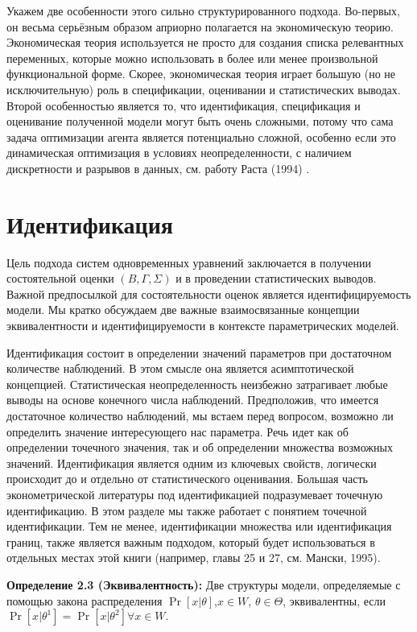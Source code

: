 Укажем две особенности этого сильно структурированного подхода. 
Во-первых, он весьма серьёзным образом априорно полагается на экономическую теорию. Экономическая теория  используется не просто для создания списка релевантных переменных, которые можно использовать в более или менее произвольной  функциональной форме. Скорее,  экономическая теория играет большую (но не исключительную) роль в спецификации, оценивании и статистических выводах. Второй особенностью является то, что идентификация, спецификация и оценивание полученной модели могут быть очень сложными, потому что сама задача оптимизации агента является потенциально сложной, особенно если это динамическая оптимизация в условиях неопределенности, с наличием дискретности и разрывов в данных, см. работу Раста (1994) .


\section{Идентификация}


Цель подхода систем одновременных уравнений заключается в получении состоятельной оценки $(B,\Gamma,\Sigma)$ и в проведении статистических выводов. Важной предпосылкой для состоятельности оценок является идентифицируемость модели. Мы кратко обсуждаем две важные  взаимосвязанные концепции  эквивалентности и идентифицируемости в контексте параметрических моделей.


Идентификация состоит в определении значений параметров при достаточном количестве наблюдений. В этом смысле она является асимптотической концепцией. Статистическая неопределенность неизбежно затрагивает любые выводы на основе конечного числа наблюдений. 
Предположив, что имеется достаточное количество наблюдений, мы встаем перед вопросом, возможно ли определить значение интересующего нас параметра. Речь идет как об определении точечного значения, так и об определении множества возможных  значений. 
Идентификация является одним из ключевых свойств, логически происходит до и отдельно от  статистического оценивания. Большая часть эконометрической литературы под идентификацией подразумевает точечную идентификацию. В этом разделе мы также работает с понятием точечной идентификации. Тем не менее, идентификации множества или идентификация границ, также является важным подходом, который будет использоваться в отдельных местах этой книги (например, главы 25 и 27, см. Мански, 1995).


{\bf Определение 2.3 (Эквивалентность):} Две структуры модели, определяемые с помощью закона распределения  $\Pr[x|\theta]$,$x\in W$, $\theta \in \Theta$,  эквивалентны, если $\Pr[x|\theta^{1}]=\Pr[x|\theta^{2}] \forall x \in W.$ 


